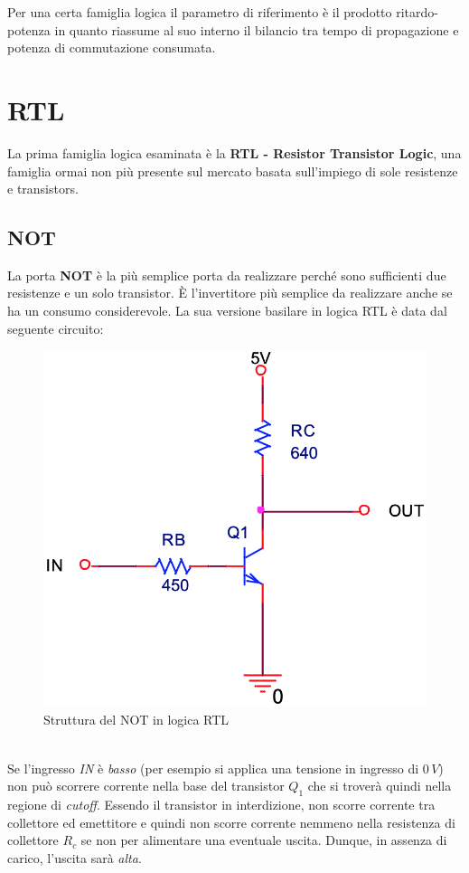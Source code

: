 \documentclass[12pt, a4paper]{report}
\begin{document}
Per una certa famiglia logica il parametro di riferimento è il prodotto ritardo-potenza in quanto riassume al suo interno il bilancio tra tempo di propagazione e potenza di commutazione consumata.

\chapter{RTL}
La prima famiglia logica esaminata è la \textbf{RTL - Resistor Transistor Logic}, una famiglia ormai non più presente sul mercato basata sull'impiego di sole resistenze e transistors.

\section{NOT}
La porta \textbf{NOT} è la più semplice porta da realizzare perché sono sufficienti due resistenze e un solo transistor. È l'invertitore più semplice da realizzare anche se ha un consumo considerevole. La sua versione basilare in logica RTL è data dal seguente circuito:
\begin{figure}[h]
    \centering
    \includegraphics[scale=0.38,angle=0]{rtl_not.png}
    \caption{Struttura del NOT in logica RTL}
\end{figure}
\\Se l'ingresso \textit{IN} è  \textit{basso} (per esempio si applica una tensione in ingresso di $0\,V$) non può scorrere corrente nella base del transistor $Q_1$ che si troverà quindi nella regione di \textit{cutoff}. Essendo il transistor in interdizione, non scorre corrente tra collettore ed emettitore e quindi non scorre corrente nemmeno nella resistenza di collettore $R_c$ se non per alimentare una eventuale uscita. Dunque, in assenza di carico, l'uscita sarà \textit{alta}.
\end{document}
